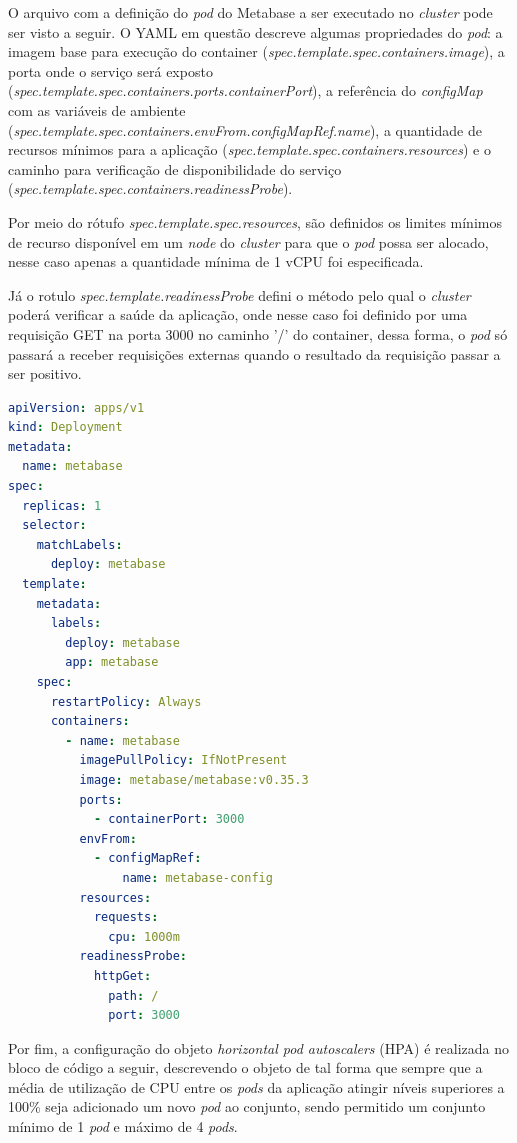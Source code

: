 O arquivo com a definição do \textit{pod} do Metabase a ser executado no \textit{cluster} pode ser visto a seguir. O YAML em questão descreve algumas propriedades do \textit{pod}: a imagem base para execução do container (\textit{spec.template.spec.containers.image}), a porta onde o serviço será exposto (\textit{spec.template.spec.containers.ports.containerPort}), a referência do \textit{configMap} com as variáveis de ambiente (\textit{spec.template.spec.containers.envFrom.configMapRef.name}), a quantidade de recursos mínimos para a aplicação (\textit{spec.template.spec.containers.resources}) e o caminho para verificação de disponibilidade do serviço (\textit{spec.template.spec.containers.readinessProbe}). 

Por meio do rótufo \textit{spec.template.spec.resources}, são definidos os limites mínimos de recurso disponível em um \textit{node} do \textit{cluster} para que o \textit{pod} possa ser alocado, nesse caso apenas a quantidade mínima de 1 vCPU foi especificada. 

Já o rotulo \textit{spec.template.readinessProbe} defini o método pelo qual o \textit{cluster} poderá verificar a saúde da aplicação, onde nesse caso foi definido por uma requisição GET na porta 3000 no caminho '/' do container, dessa forma, o \textit{pod} só passará a receber requisições externas quando o resultado da requisição passar a ser positivo.

\begin{lstlisting}[caption={YAML de configuração do \textit{deployment}},label={lst:deployment},language=yaml]
apiVersion: apps/v1
kind: Deployment
metadata:
  name: metabase
spec:
  replicas: 1
  selector:
    matchLabels:
      deploy: metabase
  template:
    metadata:
      labels:
        deploy: metabase
        app: metabase
    spec:
      restartPolicy: Always
      containers:
        - name: metabase
          imagePullPolicy: IfNotPresent
          image: metabase/metabase:v0.35.3
          ports:
            - containerPort: 3000
          envFrom:
            - configMapRef:
                name: metabase-config
          resources:
            requests:
              cpu: 1000m
          readinessProbe:
            httpGet:
              path: /
              port: 3000
\end{lstlisting} 

Por fim, a configuração do objeto \textit{horizontal pod autoscalers} (HPA) é realizada no bloco de código a seguir, descrevendo o objeto de tal forma que sempre que a média de utilização de CPU entre os \textit{pods} da aplicação atingir níveis superiores a 100\% seja adicionado um novo \textit{pod} ao conjunto, sendo permitido um conjunto mínimo de 1 \textit{pod} e máximo de 4 \textit{pods}. 

